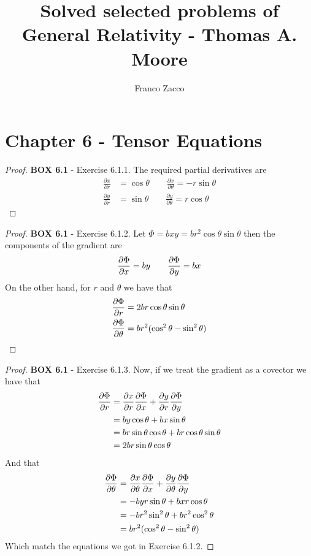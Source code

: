 \documentclass[11pt]{article}
\title{\textbf{Solved selected problems of General Relativity - Thomas A. Moore}}
\author{Franco Zacco}
\date{}
\theoremstyle{definition}
\begin{document}
\maketitle
\thispagestyle{empty}

\section*{Chapter 6 - Tensor Equations}

\begin{proof}{\textbf{BOX 6.1} - Exercise 6.1.1.}
    The required partial derivatives are
    \begin{align*}
        \frac{\partial x}{\partial r} &= \cos\theta \quad\quad
        \frac{\partial x}{\partial \theta} = -r\sin\theta\\
        \frac{\partial y}{\partial r} &= \sin\theta \quad\quad
        \frac{\partial y}{\partial \theta} = r\cos\theta
    \end{align*}
\end{proof}
\begin{proof}{\textbf{BOX 6.1} - Exercise 6.1.2.}
    Let $\Phi = bxy = br^2\cos\theta\sin\theta$ then the components of the gradient
    are
    \begin{align*}
        \partialderivative{\Phi}{x} = by \quad\quad
        \partialderivative{\Phi}{y} = bx
    \end{align*}
    On the other hand, for $r$ and $\theta$ we have that
    \begin{align*}
        \partialderivative{\Phi}{r} &= 2br\cos\theta\sin\theta\\
        \partialderivative{\Phi}{\theta} &= br^2(\cos^2\theta - \sin^2\theta)
    \end{align*}
\end{proof}
\begin{proof}{\textbf{BOX 6.1} - Exercise 6.1.3.}
    Now, if we treat the gradient as a covector we have that
    \begin{align*}
        \partialderivative{\Phi}{r} &=
        \partialderivative{x}{r}\partialderivative{\Phi}{x}
        + \partialderivative{y}{r}\partialderivative{\Phi}{y}\\
        &= by\cos\theta + bx\sin\theta\\
        &= br\sin\theta\cos\theta + br\cos\theta\sin\theta\\
        &= 2br\sin\theta\cos\theta
    \end{align*}
    And that
    \begin{align*}
        \partialderivative{\Phi}{\theta} &=
        \partialderivative{x}{\theta}\partialderivative{\Phi}{x}
        + \partialderivative{y}{\theta}\partialderivative{\Phi}{y}\\
        &= -byr\sin\theta + bxr\cos\theta\\
        &= -br^2\sin^2\theta + br^2\cos^2\theta\\
        &= br^2(\cos^2\theta- \sin^2\theta)
    \end{align*}
    Which match the equations we got in Exercise 6.1.2.
\end{proof}
\end{document}
